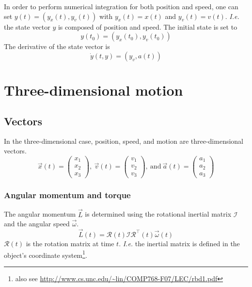 \documentclass[12pt,a4paper,twoside]{article}
\begin{document}
In order to perform numerical integration for both position and speed, one can set  $y(t) = (y_x(t), y_v(t))$ with $y_x(t)= x(t)$ and $y_v(t) = v(t)$.
\emph{I.e.} the state vector $y$ is composed of position and speed.
The initial state is set to
\begin{equation*}
  y(t_0) = (y_x(t_0), y_v(t_0))
\end{equation*}
The derivative of the state vector is
\begin{equation*}
  \dot{y}(t, y) = (y_v, a(t))
\end{equation*}

\section{Three-dimensional motion}
\subsection{Vectors}
In the three-dimensional case, position, speed, and motion are three-dimensional vectors.
\begin{equation*}
  \vec{x}(t) = \begin{pmatrix} x_1 \\ x_2 \\ x_3 \end{pmatrix}\mathrm{,\ }
  \vec{v}(t) = \begin{pmatrix} v_1 \\ v_2 \\ v_3 \end{pmatrix}\mathrm{,\ and\ }
  \vec{a}(t) = \begin{pmatrix} a_1 \\ a_2 \\ a_3 \end{pmatrix}
\end{equation*}

\subsubsection{Angular momentum and torque}
The angular momentum $\vec{L}$ is determined using the rotational inertial matrix $\mathcal{I}$ and the angular speed $\vec{\omega}$.
\begin{equation*}
  \vec{L}(t) = \mathcal{R}(t) \mathcal{I} \mathcal{R}^\top(t) \vec{\omega}(t)
\end{equation*}
$\mathcal{R}(t)$ is the rotation matrix at time $t$.
\emph{I.e.} the inertial matrix is defined in the object's coordinate system\footnote{also see \url{http://www.cs.unc.edu/~lin/COMP768-F07/LEC/rbd1.pdf}}.
\end{document}

